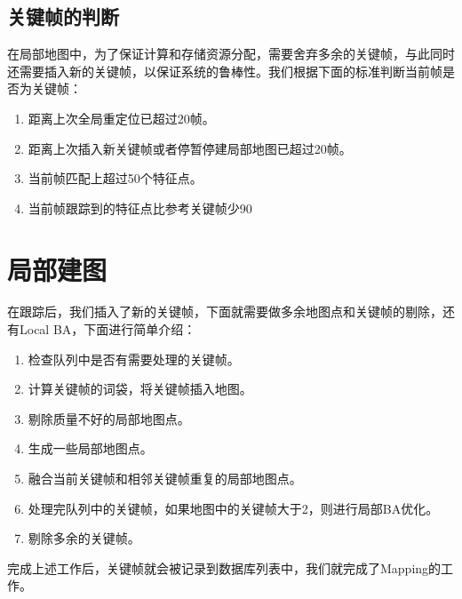 \subsection{关键帧的判断}
在局部地图中，为了保证计算和存储资源分配，需要舍弃多余的关键帧，与此同时还需要插入新的关键帧，以保证系统的鲁棒性。我们根据下面的标准判断当前帧是否为关键帧：\par
\begin{enumerate}
\item 距离上次全局重定位已超过20帧。
\item 距离上次插入新关键帧或者停暂停建局部地图已超过20帧。
\item 当前帧匹配上超过50个特征点。
\item 当前帧跟踪到的特征点比参考关键帧少90%
\end{enumerate}
\section{局部建图}
在跟踪后，我们插入了新的关键帧，下面就需要做多余地图点和关键帧的剔除，还有Local BA，下面进行简单介绍：\par
\begin{enumerate}
	\item 检查队列中是否有需要处理的关键帧。
	\item 计算关键帧的词袋，将关键帧插入地图。
	\item 剔除质量不好的局部地图点。
	\item 生成一些局部地图点。
	\item 融合当前关键帧和相邻关键帧重复的局部地图点。
	\item 处理完队列中的关键帧，如果地图中的关键帧大于2，则进行局部BA优化。
	\item 剔除多余的关键帧。
\end{enumerate}
完成上述工作后，关键帧就会被记录到数据库列表中，我们就完成了Mapping的工作。





















